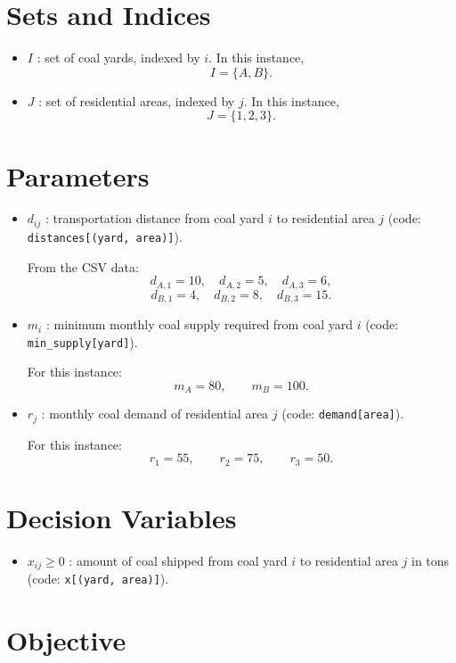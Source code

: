 \section*{Sets and Indices}

\begin{itemize}
    \item $I$ : set of coal yards, indexed by $i$. In this instance,
    \[
    I=\{A,B\}.
    \]
    \item $J$ : set of residential areas, indexed by $j$. In this instance,
    \[
    J=\{1,2,3\}.
    \]
\end{itemize}

\section*{Parameters}

\begin{itemize}
    \item $d_{ij}$ : transportation distance from coal yard $i$ to residential area $j$ (code: \texttt{distances[(yard, area)]}).
    
    From the CSV data:
    \[
    d_{A,1}=10,\quad d_{A,2}=5,\quad d_{A,3}=6,
    \]
    \[
    d_{B,1}=4,\quad d_{B,2}=8,\quad d_{B,3}=15.
    \]
    
    \item $m_i$ : minimum monthly coal supply required from coal yard $i$ (code: \texttt{min\_supply[yard]}).
    
    For this instance:
    \[
    m_A=80,\qquad m_B=100.
    \]
    
    \item $r_j$ : monthly coal demand of residential area $j$ (code: \texttt{demand[area]}).
    
    For this instance:
    \[
    r_1=55,\qquad r_2=75,\qquad r_3=50.
    \]
\end{itemize}

\section*{Decision Variables}

\begin{itemize}
    \item $x_{ij} \ge 0$ : amount of coal shipped from coal yard $i$ to residential area $j$ in tons (code: \texttt{x[(yard, area)]}).
\end{itemize}

\section*{Objective}

